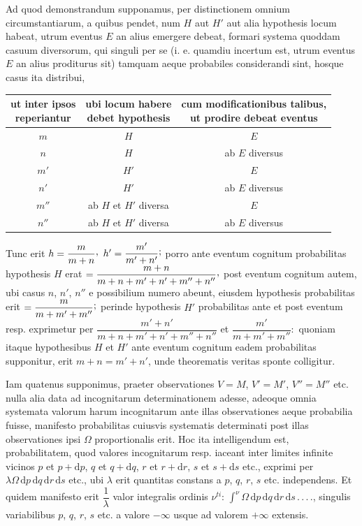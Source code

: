 Ad quod demonstrandum supponamus, per distinctionem omnium circumstantiarum,
a quibus pendet, num $H$ aut $H'$ aut alia hypothesis locum habeat, utrum eventus
$E$ an alius emergere debeat, formari systema quoddam casuum diversorum, qui
singuli per se (i. e. quamdiu incertum est, utrum eventus $E$ an alius
proditurus sit) tamquam aeque probabiles considerandi sint, hosque casus ita
distribui,
\begin{center}
\small
\begin{tabular}{c|c|c}
\shortstack{ut inter ipsos\\reperiantur} & \shortstack{ubi locum habere\\debet hypothesis} & \shortstack{cum modificationibus talibus,\\ut prodire debeat eventus} \\
\hline
$m$ & $H$ & $E$ \\
$n$ & $H$ & ab $E$ diversus \\
$m'$ & $H'$ & $E$ \\
$n'$ & $H'$ & ab $E$ diversus \\
$m''$ & ab $H$ et $H'$ diversa & $E$ \\
$n''$ & ab $H$ et $H'$ diversa & ab $E$ diversus
\end{tabular}
\end{center}
Tunc erit $h=\dfrac{m}{m+n}\mathpunct{\raisebox{.45ex}{,}}$
$h'=\dfrac{m'}{m'+n'}\mathpunct{\raisebox{.45ex}{;}}$ porro ante eventum
cognitum probabilitas hypothesis $H$ erat
$=\dfrac{m+n}{m+n+m'+n'+m''+n''}\mathpunct{\raisebox{.45ex}{,}}$ post eventum
cognitum autem, ubi casus $n$, $n'$, $n''$ e possibilium numero abeunt, eiusdem
hypothesis probabilitas erit $=\dfrac{m}{m+m'+m''}\mathpunct{\raisebox{.45ex}{;}}$
perinde hypothesis $H'$ probabilitas ante et post eventum resp. exprimetur per
$\dfrac{m'+n'}{m+n+m'+n'+m''+n''}$ et $\dfrac{m'}{m+m'+m''}\mathpunct{:}$
quoniam itaque hypothesibus $H$ et $H'$ ante eventum cognitum eadem probabilitas
supponitur, erit $m+n=m'+n'$, unde theorematis veritas sponte colligitur.

Iam quatenus supponimus, praeter observationes $V=M$, $V'=M'$, $V''=M''$ etc.
nulla alia data ad incognitarum determinationem adesse, adeoque omnia systemata
valorum harum incognitarum ante illas observationes aeque probabilia fuisse,
manifesto probabilitas cuiusvis systematis determinati post illas observationes
ipsi $\Omega$ proportionalis erit. Hoc ita intelligendum est, probabilitatem,
quod valores incognitarum resp. iaceant inter limites infinite vicinos $p$ et
$p+\mathrm{d}p$, $q$ et $q+\mathrm{d}q$, $r$ et $r+\mathrm{d}r$, $s$ et
$s+\mathrm{d}s$ etc., exprimi per $\lambda\Omega\,\mathrm{d}p\,\mathrm{d}q\,\mathrm{d}r\,\mathrm{d}s$
etc., ubi $\lambda$ erit quantitas constans a $p$, $q$, $r$, $s$ etc. independens.
Et quidem manifesto erit $\dfrac{1}{\lambda}$ valor integralis ordinis
$\nu^{ti}$: $\int^{\nu}\Omega\,\mathrm{d}p\,\mathrm{d}q\,\mathrm{d}r\,\mathrm{d}s\, .\, .\, .\, .$,
singulis variabilibus $p$, $q$, $r$, $s$ etc. a valore $-\infty$ usque ad valorem
$+\infty$ extensis.
